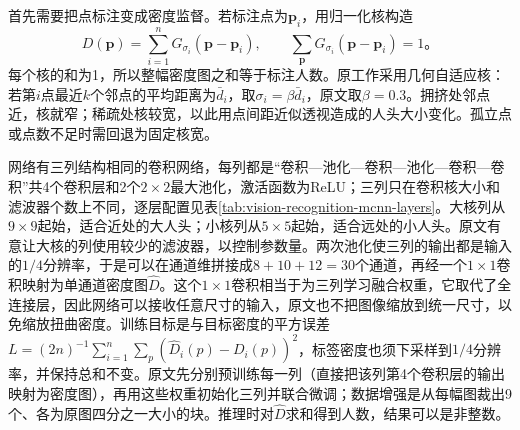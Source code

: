 首先需要把点标注变成密度监督。若标注点为$\bm{p}_i$，用归一化核构造
\begin{equation}
 D(\bm{p})=\sum_{i=1}^{n}G_{\sigma_i}(\bm{p}-\bm{p}_i),
 \qquad
 \sum_{\bm{p}}G_{\sigma_i}(\bm{p}-\bm{p}_i)=1\text{。}
 \label{eq:vision-density-target}
\end{equation}
每个核的和为1，所以整幅密度图之和等于标注人数。原工作采用几何自适应核：若第$i$点最近$k$个邻点的平均距离为$\bar d_i$，取$\sigma_i=\beta\bar d_i$，原文取$\beta=0.3$。拥挤处邻点近，核就窄；稀疏处核较宽，以此用点间距近似透视造成的人头大小变化。孤立点或点数不足时需回退为固定核宽。

网络有三列结构相同的卷积网络，每列都是“卷积—池化—卷积—池化—卷积—卷积”共4个卷积层和2个$2\times2$最大池化，激活函数为ReLU；三列只在卷积核大小和滤波器个数上不同，逐层配置见表\ref{tab:vision-recognition-mcnn-layers}。大核列从$9\times9$起始，适合近处的大人头；小核列从$5\times5$起始，适合远处的小人头。原文有意让大核的列使用较少的滤波器，以控制参数量。两次池化使三列的输出都是输入的$1/4$分辨率，于是可以在通道维拼接成$8+10+12=30$个通道，再经一个$1\times1$卷积映射为单通道密度图$\hat D$。这个$1\times1$卷积相当于为三列学习融合权重，它取代了全连接层，因此网络可以接收任意尺寸的输入，原文也不把图像缩放到统一尺寸，以免缩放扭曲密度。训练目标是与目标密度的平方误差$L=(2n)^{-1}\sum_{i=1}^n\sum_p(\hat D_i(p)-D_i(p))^2$，标签密度也须下采样到$1/4$分辨率，并保持总和不变。原文先分别预训练每一列（直接把该列第4个卷积层的输出映射为密度图），再用这些权重初始化三列并联合微调；数据增强是从每幅图裁出9个、各为原图四分之一大小的块。推理时对$\hat D$求和得到人数，结果可以是非整数。

